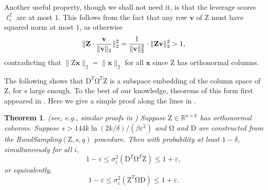 \documentclass[11pt]{article}
\newtheorem{theorem}{Theorem}
\newcommand{\mat}[1]{{\ensuremath{\bm{\mathrm{#1}}}}}
\def\ve{{\mathbf v}}
\def\matD{\mat{D}}
\def\matZ{\mat{Z}}
\def\frac#1#2{{#1\over #2}}
\def\x{{\mathbf x}}
\newcommand{\eps}{\varepsilon}
\begin{document}
Another useful property, though we shall not need it, is that the leverage scores $\ell_i^2$ are at most $1$. This follows
from the fact that any row $\ve$ of $\matZ$ must have squared norm at most $1$, as otherwise 
$$\|\matZ \cdot \frac{\ve}{\|\ve\|_2}\|_2^2 = \frac{1}{\|\ve \|_2^2} \cdot \|\matZ \ve \|_2^2 > 1,$$
contradicting that $\|\matZ \x\|_2 = \|\x\|_2$ for all $\x$ since $\matZ$ has orthonormal columns. 

The following shows that $\matD^T \mat\Omega^T \matZ$ 
is a subspace embedding of the column space of $\matZ$, for $s$ large enough.
To the best of our knowledge, theorems of this form first appeared in \cite{DMM06c,DMM06d}. Here we give a simple
proof along the lines in \cite{Mag10}.   
\begin{theorem}\label{thm:lssPerf}(see, e.g., similar proofs in \cite{Mag10})
Suppose $\matZ \in \mathbb{R}^{n \times k}$ has orthonormal columns. Suppose $s > 144k \ln(2k/\delta)/(\beta \eps^2)$ 
and $\mat\Omega$ and $\matD$
are constructed from the {\textsc RandSampling}$(\matZ,s,q)$ procedure. Then with probability
at least $1-\delta$, simultaneously for all $i$, 
$$1 - \eps \leq \sigma_i^2 (\matD^T \mat\Omega^T \matZ) \leq 1 + \eps,$$
or equivalently,
$$1-\eps \leq \sigma_i^2 (\matZ^T \mat\Omega \matD) \leq 1+\eps.$$
\end{theorem}
\end{document}
